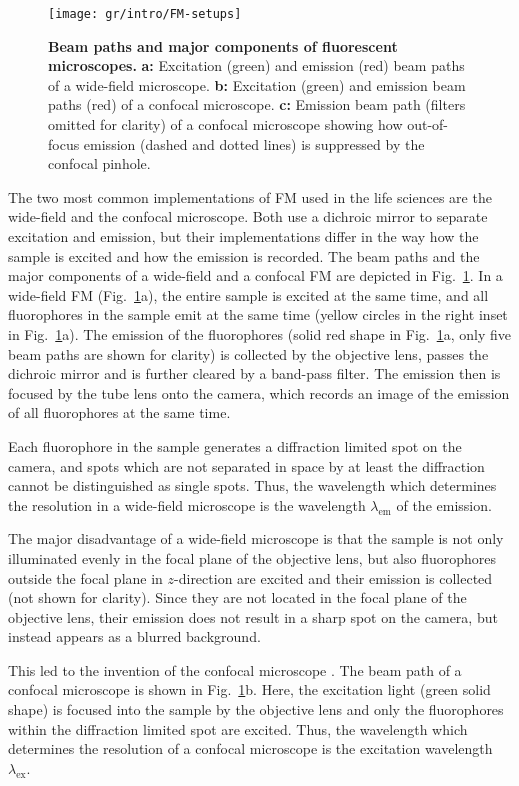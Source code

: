 \begin{figure}
  \texttt{[image: gr/intro/FM-setups]}
  \caption{\textbf{Beam paths and major components of fluorescent
      microscopes.} \textbf{a:} Excitation (green) and emission (red) beam
    paths of a wide-field microscope. \textbf{b:} Excitation (green) and
    emission beam paths (red) of a confocal microscope.  \textbf{c:} Emission
    beam path (filters omitted for clarity) of a confocal microscope showing
    how out-of-focus emission (dashed and dotted lines) is suppressed by the
    confocal pinhole.}
  \label{fig:FM-setups}
\end{figure}

The two most common implementations of FM used in the life sciences are the
wide-field and the confocal microscope. Both use a dichroic mirror to separate
excitation and emission, but their implementations differ in the way how the
sample is excited and how the emission is recorded. The beam paths and the
major components of a wide-field and a confocal FM are depicted in
Fig.~\ref{fig:FM-setups}. In a wide-field FM (Fig.~\ref{fig:FM-setups}a), the
entire sample is excited at 
the same time, and all fluorophores in the sample emit at the same time
(yellow circles in the right inset in Fig.~\ref{fig:FM-setups}a). The emission
of the fluorophores (solid red shape in Fig.~\ref{fig:FM-setups}a, only five
beam paths are shown for clarity) is collected by the objective lens, passes
the dichroic mirror and is further cleared by a band-pass filter. The emission
then is focused by the tube lens onto the camera, which records an image of
the emission of all fluorophores at the same time.

Each fluorophore in the sample generates a diffraction limited spot on the
camera, and spots which are not separated in space by at least the diffraction
cannot be distinguished as single spots. Thus, the wavelength which determines
the resolution in a wide-field microscope is the wavelength $\lambda_\text{em}$
of the emission.

The major disadvantage of a wide-field microscope is that the sample is not
only illuminated evenly in the focal plane of the objective lens, but also
fluorophores outside the focal plane in $z$-direction are excited and their
emission is collected (not shown for clarity). Since they are not located in
the focal plane of the objective lens, their emission does not result in a
sharp spot on the camera, but instead appears as a blurred background.    

This led to the invention of the confocal microscope
\cite{Heimstaedt1911,Minsky1988}. The beam path of a confocal microscope is
shown in Fig.~\ref{fig:FM-setups}b. Here, the excitation light (green solid
shape) is focused into the sample by the objective lens and only the
fluorophores within the diffraction limited spot are excited. Thus, the
wavelength which determines the resolution of a confocal microscope is the
excitation wavelength $\lambda_\text{ex}$.  



